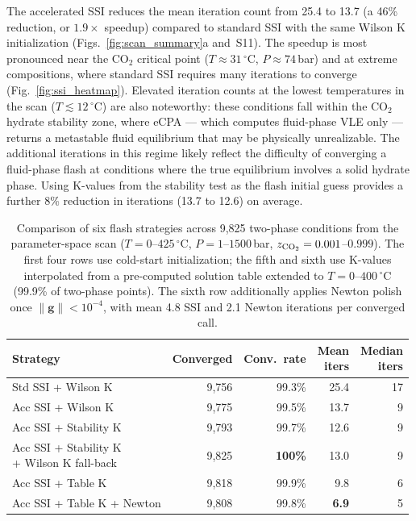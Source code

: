 \documentclass[preprint,12pt,number]{elsarticle}
\begin{document}
The accelerated SSI reduces the mean iteration count from 25.4 to 13.7
(a 46\% reduction, or $1.9\times$ speedup) compared to standard SSI with the same
Wilson K initialization (Figs.~\ref{fig:scan_summary}a and~S11).
The speedup is most pronounced near the CO$_2$ critical point ($T \approx 31\,^\circ$C,
$P \approx 74$\,bar) and at extreme compositions, where standard SSI requires many
iterations to converge (Fig.~\ref{fig:ssi_heatmap}).
Elevated iteration counts at the lowest temperatures in the scan ($T \lesssim 12\,^\circ$C)
are also noteworthy: these conditions fall within the CO$_2$ hydrate stability zone,
where eCPA --- which computes fluid-phase VLE only --- returns a metastable fluid equilibrium
that may be physically unrealizable.
The additional iterations in this regime likely reflect the difficulty of converging
a fluid-phase flash at conditions where the true equilibrium involves a solid hydrate phase.
Using K-values from the stability test as the flash initial guess provides a further
8\% reduction in iterations (13.7 to 12.6) on average.


\begin{table}[H]
  \centering
  \caption{Comparison of six flash strategies across 9{,}825 two-phase conditions
           from the parameter-space scan ($T = 0$--$425\,^\circ$C, $P = 1$--$1500$\,bar,
           $z_{\rm CO_2} = 0.001$--$0.999$).
           The first four rows use cold-start initialization;
           the fifth and sixth use K-values interpolated from a pre-computed solution table
           extended to $T = 0$--$400\,^\circ$C (99.9\% of two-phase points).
           The sixth row additionally applies Newton polish once $\|\mathbf{g}\| < 10^{-4}$,
           with mean 4.8 SSI and 2.1 Newton iterations per converged call.}
  \label{tab:accel_comparison}
  \begin{tabular}{lrrrr}
    \toprule
    Strategy & Converged & Conv.\ rate & \shortstack{Mean\\iters} & \shortstack{Median\\iters} \\
    \midrule
    Std SSI + Wilson K           & 9{,}756 & 99.3\%  & 25.4 & 17 \\
    Acc SSI + Wilson K           & 9{,}775 & 99.5\%  & 13.7 &  9 \\
    Acc SSI + Stability K        & 9{,}793 & 99.7\%  & 12.6 &  9 \\
    \shortstack[l]{Acc SSI + Stability K\\+ Wilson K fall-back} & 9{,}825 & \textbf{100\%} & 13.0 &  9 \\
    \midrule
    Acc SSI + Table K            & 9{,}818 & 99.9\%  &  9.8 &  6 \\
    Acc SSI + Table K + Newton   & 9{,}808 & 99.8\%  &  \textbf{6.9} &  5 \\
    \bottomrule
  \end{tabular}
\end{table}
\end{document}

